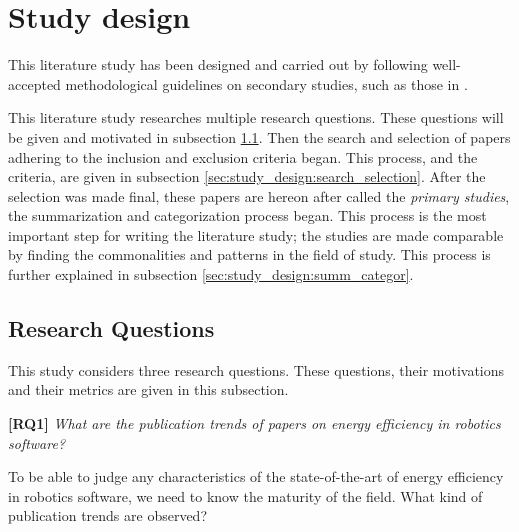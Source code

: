 \section{Study design}
\label{sec:study_design}

This literature study has been designed and carried out by following 
well-accepted methodological guidelines on secondary studies, such as those in 
\cite{petersen2015guidelines_systematic, kitchenham2013systematic_review_guidelines, wohlin2012experimentation}.

This literature study researches multiple research questions. 
These questions will be given and motivated in subsection \ref{sec:study_design:research_questions}.
Then the search and selection of papers adhering to the inclusion and exclusion criteria began.
This process, and the criteria, are given in subsection \ref{sec:study_design:search_selection}.
After the selection was made final, these papers are hereon after called the \textit{primary studies}, the summarization and categorization process began. 
This process is the most important step for writing the literature study; the studies are made comparable by finding the commonalities and patterns in the field of study. 
This process is further explained in subsection \ref{sec:study_design:summ_categor}.


\subsection{Research Questions}
\label{sec:study_design:research_questions}
This study considers three research questions. These questions, their motivations and their metrics are given in this subsection.

\vspace{5mm}

\textbf{[RQ1]} \textit{What are the publication trends of papers on energy efficiency in robotics software?}

\vspace{5mm}

To be able to judge any characteristics of the state-of-the-art of energy efficiency in robotics software, we need to know the maturity of the field. What kind of publication trends are observed?

\vspace{5mm}


